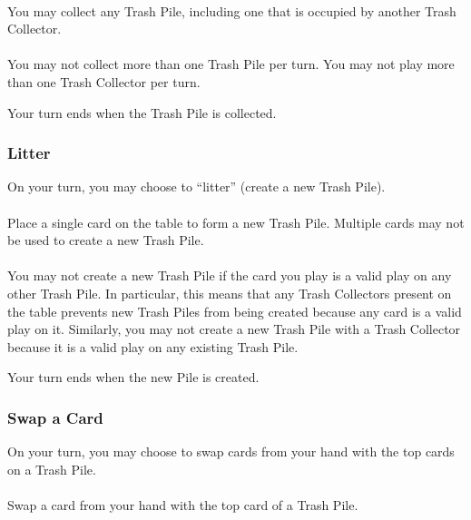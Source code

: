 \documentclass{article}
\begin{document}
\paragraph{\label{par:collectcollector}}
You may collect any Trash Pile, including one that is occupied by another Trash Collector.

\paragraph{\label{par:collectsingle}}
You may not collect more than one Trash Pile per turn. You may not play more than one Trash Collector per turn.

Your turn ends when the Trash Pile is collected.

\subsubsection{Litter \label{sec:litter}}

On your turn, you may choose to ``litter'' (create a new Trash Pile).

\paragraph{\label{par:littercreate}}
Place a single card on the table to form a new Trash Pile. Multiple cards may not be used to create a new Trash Pile.

\paragraph{\label{par:litterrestriction}}
You may not create a new Trash Pile if the card you play is a valid play on any other Trash Pile. In particular, this means that any Trash Collectors present on the table prevents new Trash Piles from being created because any card is a valid play on it. Similarly, you may not create a new Trash Pile with a Trash Collector because it is a valid play on any existing Trash Pile.

Your turn ends when the new Pile is created.

\newpage
\subsubsection{Swap a Card \label{sec:swap}}

On your turn, you may choose to swap cards from your hand with the top cards on a Trash Pile.

\paragraph{\label{par:swaptop}}
Swap a card from your hand with the top card of a Trash Pile.
\end{document}
